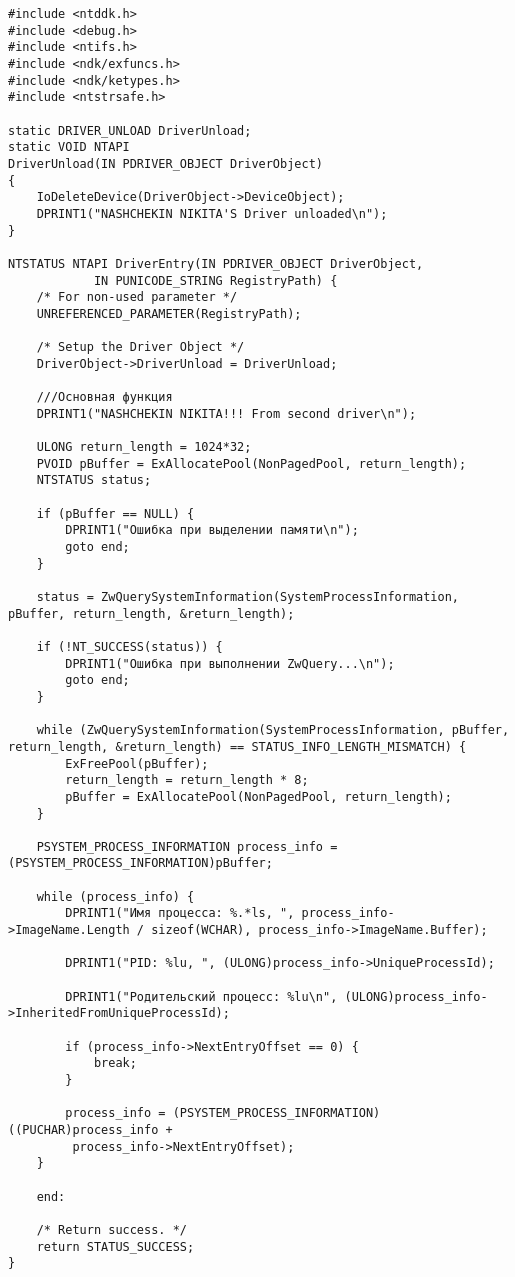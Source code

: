 \documentclass[a4paper, 14pt]{extarticle}
\begin{document}
\begin{verbatim}
#include <ntddk.h>
#include <debug.h>
#include <ntifs.h>
#include <ndk/exfuncs.h>
#include <ndk/ketypes.h>
#include <ntstrsafe.h>

static DRIVER_UNLOAD DriverUnload;
static VOID NTAPI
DriverUnload(IN PDRIVER_OBJECT DriverObject)
{
    IoDeleteDevice(DriverObject->DeviceObject);
	DPRINT1("NASHCHEKIN NIKITA'S Driver unloaded\n");
}

NTSTATUS NTAPI DriverEntry(IN PDRIVER_OBJECT DriverObject,
            IN PUNICODE_STRING RegistryPath) {
    /* For non-used parameter */
    UNREFERENCED_PARAMETER(RegistryPath);
    
    /* Setup the Driver Object */
    DriverObject->DriverUnload = DriverUnload;

	///Основная функция 
    DPRINT1("NASHCHEKIN NIKITA!!! From second driver\n");
    
    ULONG return_length = 1024*32;
    PVOID pBuffer = ExAllocatePool(NonPagedPool, return_length);
    NTSTATUS status;
    
    if (pBuffer == NULL) {
    	DPRINT1("Ошибка при выделении памяти\n");
    	goto end;
    } 
   
    status = ZwQuerySystemInformation(SystemProcessInformation, pBuffer, return_length, &return_length);
    
    if (!NT_SUCCESS(status)) {
    	DPRINT1("Ошибка при выполнении ZwQuery...\n");
    	goto end;
    }
    
    while (ZwQuerySystemInformation(SystemProcessInformation, pBuffer, return_length, &return_length) == STATUS_INFO_LENGTH_MISMATCH) {
    	ExFreePool(pBuffer);
    	return_length = return_length * 8;
    	pBuffer = ExAllocatePool(NonPagedPool, return_length);
    }
    
    PSYSTEM_PROCESS_INFORMATION process_info = (PSYSTEM_PROCESS_INFORMATION)pBuffer;
    
    while (process_info) {
    	DPRINT1("Имя процесса: %.*ls, ", process_info->ImageName.Length / sizeof(WCHAR), process_info->ImageName.Buffer);
    	
    	DPRINT1("PID: %lu, ", (ULONG)process_info->UniqueProcessId);
    	
    	DPRINT1("Родительский процесс: %lu\n", (ULONG)process_info->InheritedFromUniqueProcessId);
    	
    	if (process_info->NextEntryOffset == 0) {
            break;
        }

        process_info = (PSYSTEM_PROCESS_INFORMATION)((PUCHAR)process_info +
         process_info->NextEntryOffset);
    }
    
    end:
    
    /* Return success. */
    return STATUS_SUCCESS;
}
\end{verbatim}
\end{document}
